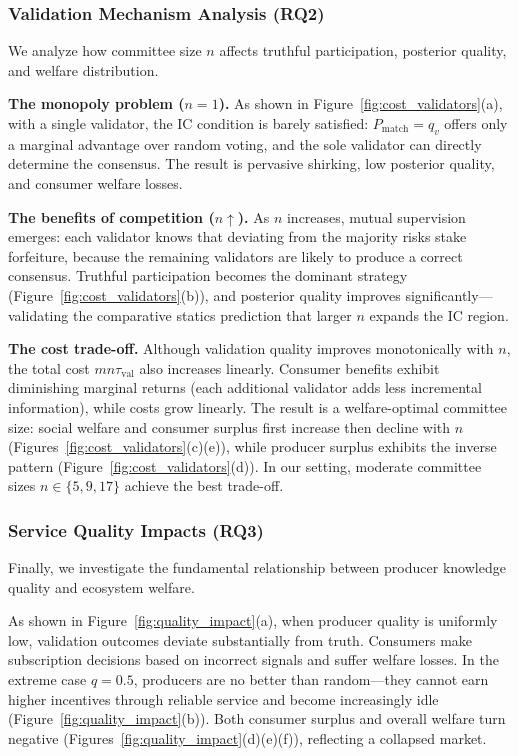 \subsubsection{Validation Mechanism Analysis (RQ2)}

We analyze how committee size $n$ affects truthful participation, posterior quality, and welfare distribution.

\textbf{The monopoly problem ($n = 1$).}
As shown in Figure~\ref{fig:cost_validators}(a), with a single validator, the IC condition is barely satisfied: $P_{\text{match}} = q_v$ offers only a marginal advantage over random voting, and the sole validator can directly determine the consensus.
The result is pervasive shirking, low posterior quality, and consumer welfare losses.

\textbf{The benefits of competition ($n \uparrow$).}
As $n$ increases, mutual supervision emerges: each validator knows that deviating from the majority risks stake forfeiture, because the remaining validators are likely to produce a correct consensus.
Truthful participation becomes the dominant strategy (Figure~\ref{fig:cost_validators}(b)), and posterior quality improves significantly---validating the comparative statics prediction that larger $n$ expands the IC region.

\textbf{The cost trade-off.}
Although validation quality improves monotonically with $n$, the total cost $mn\tau_{\text{val}}$ also increases linearly.
Consumer benefits exhibit diminishing marginal returns (each additional validator adds less incremental information), while costs grow linearly.
The result is a welfare-optimal committee size: social welfare and consumer surplus first increase then decline with $n$ (Figures~\ref{fig:cost_validators}(c)(e)), while producer surplus exhibits the inverse pattern (Figure~\ref{fig:cost_validators}(d)).
In our setting, moderate committee sizes $n \in \{5, 9, 17\}$ achieve the best trade-off.


\subsubsection{Service Quality Impacts (RQ3)}

Finally, we investigate the fundamental relationship between producer knowledge quality and ecosystem welfare.

As shown in Figure~\ref{fig:quality_impact}(a), when producer quality is uniformly low, validation outcomes deviate substantially from truth.
Consumers make subscription decisions based on incorrect signals and suffer welfare losses.
In the extreme case $q = 0.5$, producers are no better than random---they cannot earn higher incentives through reliable service and become increasingly idle (Figure~\ref{fig:quality_impact}(b)).
Both consumer surplus and overall welfare turn negative (Figures~\ref{fig:quality_impact}(d)(e)(f)), reflecting a collapsed market.


